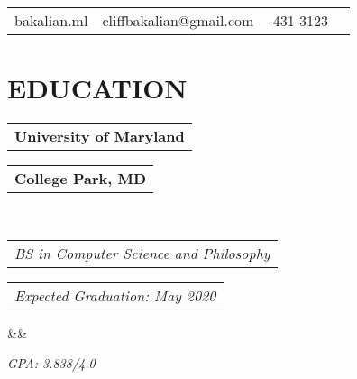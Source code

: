 \documentclass[11pt,a4paper,roman]{moderncv}
\makeatletter
\newcommand*{\customcventry}[7][.25em]{
  \begin{tabular}{@{}l} 
    {\bfseries #4}
  \end{tabular}
  \hfill
  \begin{tabular}{l@{}}
     {\bfseries #5}
  \end{tabular} \\
  \begin{tabular}{@{}l} 
    {\itshape #3}
  \end{tabular}
  \hfill
  \begin{tabular}{l@{}}
     {\itshape #2}
  \end{tabular}
  \ifx&#7&%
  \else{\\%
    \begin{minipage}{\maincolumnwidth}%
      \small#7%
    \end{minipage}}\fi%
  \par\addvspace{#1}}
\makeatother
\begin{document}
\makecvtitle
\vspace*{-23mm}

\begin{center}
\begin{tabular}{ c c c c }
 \enspace bakalian.ml & \enspace cliffbakalian@gmail.com & \enspace 215-431-3123\\  
\end{tabular}
\end{center}

\section{EDUCATION}
{\customcventry{Expected Graduation: May 2020}{BS in Computer Science and Philosophy}{University of Maryland}{College Park, MD}{}{}}
\hfill {\itshape GPA: 3.838/4.0}
\end{document}
